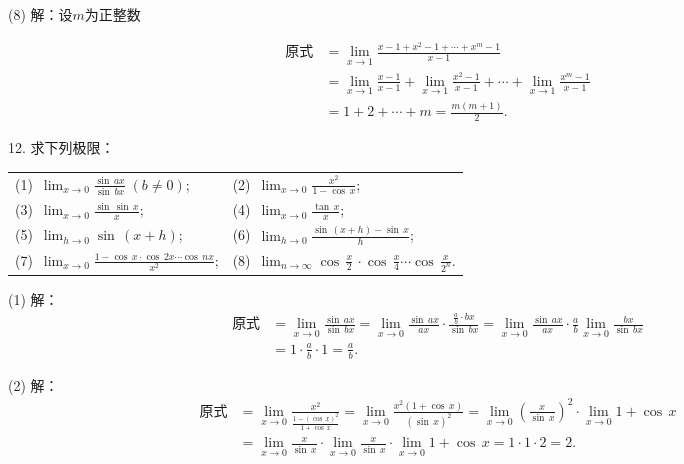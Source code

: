 (8) 解：设$m$为正整数

\begin{align}
    \text{原式} &= \lim_{x \to 1} \frac{x-1 + x^2-1 + \cdots + x^m - 1}{x-1} \\
    &= \lim_{x \to 1} \frac{x-1}{x-1} + \lim_{x \to 1} \frac{x^2-1}{x-1} + \cdots + \lim_{x \to 1} \frac{x^m-1}{x-1} \\
    &= 1 + 2 + \cdots + m = \frac{m(m+1)}{2}.
\end{align}

12. 求下列极限：
\begin{table}[H]
    \centering
    \begin{tabularx}{\textwidth} {  >{\raggedright\arraybackslash}X >{\raggedright\arraybackslash}X  }
       (1)~$\displaystyle\lim_{x \to 0} \displaystyle\frac{\sin \, ax}{\sin \, bx} \; (b \neq 0)$; & (2)~$\displaystyle\lim_{x \to 0}\displaystyle\frac{x^2}{1-\cos \, x}$; \\ [1em]
       (3)~$\displaystyle\lim_{x \to 0} \frac{\sin \, \sin \, x}{x}$; & (4)~$\displaystyle\lim_{x \to 0} \displaystyle\frac{\tan \, x}{x}$; \\ [1em]
       (5)~$\displaystyle\lim_{h \to 0} \sin \, \left(x+h\right)$; & (6)~$\displaystyle\lim_{h \to 0} \displaystyle\frac{\sin \, \left(x+h\right)-\sin \, x}{h}$; \\ [1em] 
       (7)~$\displaystyle\lim_{x \to 0} \displaystyle\frac{1-\cos \, x \cdot \cos \, 2x \cdots \cos \, nx}{x^2}$; & (8)~$\displaystyle\lim_{n \to \infty} \cos \, \displaystyle\frac{x}{2} \, \cdot \cos \, \displaystyle\frac{x}{4} \cdots \cos \, \displaystyle\frac{x}{2^n}$.
      \end{tabularx}
\end{table}

(1) 解：
\begin{align}
    \text{原式} &= \lim_{x \to 0} \frac{\sin \, ax}{\sin \, bx} = \lim_{x \to 0} \frac{\sin \, ax}{ax} \cdot \frac{\displaystyle\frac{a}{b} \cdot bx}{\sin \, bx} = \lim_{x \to 0}\frac{\sin \, ax}{ax} \cdot \frac{a}{b} \lim_{x \to 0} \frac{bx}{\sin \, bx} \\
    &= 1 \cdot \frac{a}{b} \cdot 1 = \frac{a}{b}.
\end{align}

(2) 解：
\begin{align}
    \text{原式} &= \lim_{x \to 0} \frac{x^2}{\displaystyle\frac{1-(\cos \, x)^2}{1+\cos \, x}} = \lim_{x \to 0} \frac{x^2 (1+\cos \, x)}{(\sin \, x)^2} = \lim_{x \to 0} \left(\frac{x}{\sin \, x}\right)^2 \cdot \lim_{x \to 0} 1 + \cos \, x \\
    &= \lim_{x \to 0} \frac{x}{\sin \, x} \cdot \lim_{x \to 0} \frac{x}{\sin \, x} \cdot \lim_{x \to 0} 1+\cos \, x= 1 \cdot 1 \cdot 2 = 2.
\end{align}

